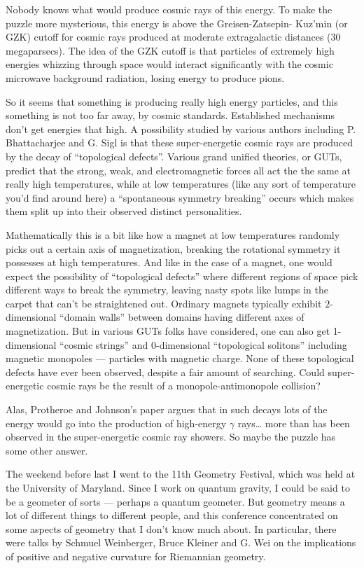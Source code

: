\documentclass{article}
\begin{document}
Nobody knows what would produce cosmic rays of this energy. To make the
puzzle more mysterious, this energy is above the Greisen-Zatsepin-
Kuz'min (or GZK) cutoff for cosmic rays produced at moderate
extragalactic distances (30 megaparsecs). The idea of the GZK cutoff is
that particles of extremely high energies whizzing through space would
interact significantly with the cosmic microwave background radiation,
losing energy to produce pions.

So it seems that something is producing really high energy particles,
and this something is not too far away, by cosmic standards. Established
mechanisms don't get energies that high. A possibility studied by
various authors including P. Bhattacharjee and G. Sigl is that these
super-energetic cosmic rays are produced by the decay of ``topological
defects''. Various grand unified theories, or GUTs, predict that the
strong, weak, and electromagnetic forces all act the the same at really
high temperatures, while at low temperatures (like any sort of
temperature you'd find around here) a ``spontaneous symmetry breaking''
occurs which makes them split up into their observed distinct
personalities.

Mathematically this is a bit like how a magnet at low temperatures
randomly picks out a certain axis of magnetization, breaking the
rotational symmetry it possesses at high temperatures. And like in the
case of a magnet, one would expect the possibility of ``topological
defects'' where different regions of space pick different ways to break
the symmetry, leaving nasty spots like lumps in the carpet that can't be
straightened out. Ordinary magnets typically exhibit \(2\)-dimensional
``domain walls'' between domains having different axes of magnetization.
But in various GUTs folks have considered, one can also get
1-dimensional ``cosmic strings'' and 0-dimensional ``topological
solitons'' including magnetic monopoles --- particles with magnetic
charge. None of these topological defects have ever been observed,
despite a fair amount of searching. Could super-energetic cosmic rays be
the result of a monopole-antimonopole collision?

Alas, Protheroe and Johnson's paper argues that in such decays lots of
the energy would go into the production of high-energy \(\gamma\)
rays\ldots{} more than has been observed in the super-energetic cosmic
ray showers. So maybe the puzzle has some other answer.

The weekend before last I went to the 11th Geometry Festival, which was
held at the University of Maryland. Since I work on quantum gravity, I
could be said to be a geometer of sorts --- perhaps a quantum geometer.
But geometry means a lot of different things to different people, and
this conference concentrated on some aspects of geometry that I don't
know much about. In particular, there were talks by Schmuel Weinberger,
Bruce Kleiner and G. Wei on the implications of positive and negative
curvature for Riemannian geometry.
\end{document}
